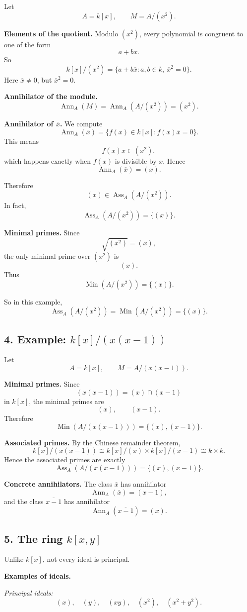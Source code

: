 \documentclass[12pt,a4paper]{article}
\theoremstyle{notespace}
\DeclareMathOperator{\Ass}{Ass}
\DeclareMathOperator{\Ann}{Ann}
\DeclareMathOperator{\Min}{Min}
\begin{document}
Let
\[
A=k[x],\qquad M=A/(x^2).
\]

\textbf{Elements of the quotient.}
Modulo \((x^2)\), every polynomial is congruent to one of the form
\[
a+bx.
\]
So
\[
k[x]/(x^2)=\{a+b\overline x:a,b\in k,\ \overline x^2=0\}.
\]
Here \(\overline x\neq 0\), but \(\overline x^2=0\).

\textbf{Annihilator of the module.}
\[
\Ann_A(M)=\Ann_A(A/(x^2))=(x^2).
\]

\textbf{Annihilator of \(\overline x\).}
We compute
\[
\Ann_A(\overline x)=\{f(x)\in k[x]:f(x)\overline x=0\}.
\]
This means
\[
f(x)x\in (x^2),
\]
which happens exactly when \(f(x)\) is divisible by \(x\). Hence
\[
\Ann_A(\overline x)=(x).
\]

Therefore
\[
(x)\in \Ass_A(A/(x^2)).
\]
In fact,
\[
\Ass_A(A/(x^2))=\{(x)\}.
\]

\textbf{Minimal primes.}
Since
\[
\sqrt{(x^2)}=(x),
\]
the only minimal prime over \((x^2)\) is
\[
(x).
\]
Thus
\[
\Min(A/(x^2))=\{(x)\}.
\]

So in this example,
\[
\Ass_A(A/(x^2))=\Min(A/(x^2))=\{(x)\}.
\]

\subsection*{4. Example: \(k[x]/(x(x-1))\)}

Let
\[
A=k[x],\qquad M=A/(x(x-1)).
\]

\textbf{Minimal primes.}
Since
\[
(x(x-1))=(x)\cap (x-1)
\]
in \(k[x]\), the minimal primes are
\[
(x),\qquad (x-1).
\]
Therefore
\[
\Min(A/(x(x-1)))=\{(x),(x-1)\}.
\]

\textbf{Associated primes.}
By the Chinese remainder theorem,
\[
k[x]/(x(x-1))\cong k[x]/(x)\times k[x]/(x-1)\cong k\times k.
\]
Hence the associated primes are exactly
\[
\Ass_A(A/(x(x-1)))=\{(x),(x-1)\}.
\]

\textbf{Concrete annihilators.}
The class \(\overline x\) has annihilator
\[
\Ann_A(\overline x)=(x-1),
\]
and the class \(\overline{x-1}\) has annihilator
\[
\Ann_A(\overline{x-1})=(x).
\]

\subsection*{5. The ring \(k[x,y]\)}

Unlike \(k[x]\), not every ideal is principal.

\textbf{Examples of ideals.}

\emph{Principal ideals:}
\[
(x),\quad (y),\quad (xy),\quad (x^2),\quad (x^2+y^2).
\]
\end{document}
